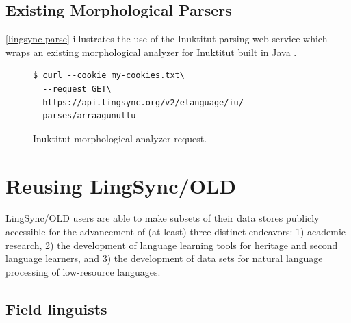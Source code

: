 \documentclass[11pt]{article}
\newcommand{\smalltodo}[2][]
    {\todo[caption={#2}, #1]
    {\tiny#2\normalsize}}
\begin{document}
\subsection{Existing Morphological Parsers}

\autoref{lingsync-parse} illustrates the use of the Inuktitut parsing web service which wraps an existing
morphological analyzer for Inuktitut built in Java \cite{Farley:2012:Online}.


\begin{figure}[h]
\scriptsize
\begin{verbatim}
$ curl --cookie my-cookies.txt\
  --request GET\
  https://api.lingsync.org/v2/elanguage/iu/
  parses/arraagunullu
\end{verbatim}
\normalsize
\caption{Inuktitut morphological analyzer request.}
\label{lingsync-parse}
\end{figure}

\section{Reusing LingSync/OLD}
\label{open-data}

LingSync/OLD users are able to make subsets of their data stores publicly
accessible for the advancement of (at least) three distinct endeavors: 1)
academic research, 2) the development of language learning tools for
heritage and second language learners, and 3) the development of data sets for
natural language processing of low-resource languages. 



\subsection{Field linguists}
\end{document}
